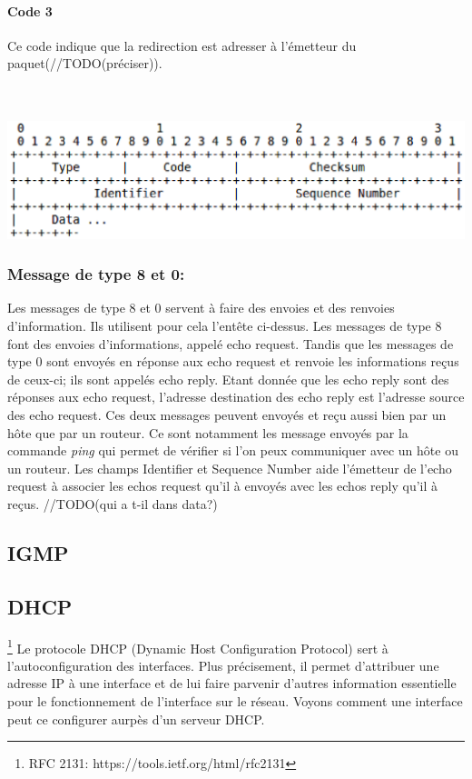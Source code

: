 \documentclass[twoside,openright,a4paper,11pt,french]{article}
\begin{document}
\paragraph{Code 3}
Ce code indique que la redirection est adresser à l'émetteur du paquet(//TODO(préciser)).

\\
\\
\includegraphics[width=15cm]{./pics/header3.eps}
\\

\subsubsection{Message de type 8 et 0:}
Les messages de type 8 et 0 servent à faire des envoies et des renvoies d'information. Ils utilisent pour cela l'entête ci-dessus. Les messages de type 8 font des envoies d'informations, appelé echo request. Tandis que les messages de type 0 sont envoyés en réponse aux echo request et renvoie les informations reçus de ceux-ci; ils sont appelés echo reply. Etant donnée que les echo reply sont des réponses aux echo request, l'adresse destination des echo reply est l'adresse source des echo request. Ces deux messages peuvent envoyés et reçu aussi bien par un hôte que par un routeur. Ce sont notamment les message envoyés par la commande {\it ping} qui permet de vérifier si l'on peux communiquer avec un hôte ou un routeur.
Les champs Identifier et Sequence Number aide l'émetteur de l'echo request à associer les echos request qu'il à envoyés avec les echos reply qu'il à reçus.
//TODO(qui a t-il dans data?)
\subsection{IGMP}
\subsection{DHCP}
\footnote{RFC 2131: https://tools.ietf.org/html/rfc2131}
Le protocole DHCP (Dynamic Host Configuration Protocol) sert à l'autoconfiguration des interfaces. Plus précisement, il  permet d'attribuer une adresse IP à une interface et de lui faire parvenir d'autres information essentielle pour le fonctionnement de l'interface sur le réseau.
Voyons comment une interface peut ce configurer aurpès d'un serveur DHCP.
\end{document}
